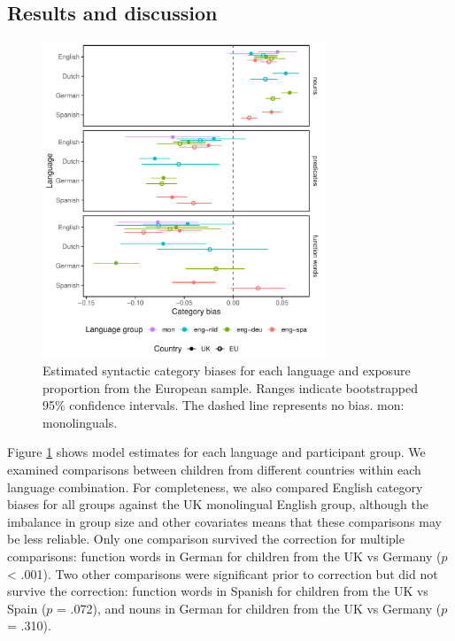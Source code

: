 \documentclass[10pt, letterpaper]{article}
\begin{document}
\subsection{Results and discussion}\label{results-and-discussion-2}

\begin{CodeChunk}
\begin{figure}[t]

{\centering \includegraphics[width=240pt]{figs/ox_bias-1} 

}

\caption[Estimated syntactic category biases for each language and exposure proportion from the European sample]{Estimated syntactic category biases for each language and exposure proportion from the European sample. Ranges indicate bootstrapped 95\% confidence intervals. The dashed line represents no bias. mon: monolinguals.}\label{fig:ox_bias}
\end{figure}
\end{CodeChunk}

Figure \ref{fig:ox_bias} shows model estimates for each language and
participant group. We examined comparisons between children from
different countries within each language combination. For completeness,
we also compared English category biases for all groups against the UK
monolingual English group, although the imbalance in group size and
other covariates means that these comparisons may be less reliable. Only
one comparison survived the correction for multiple comparisons:
function words in German for children from the UK vs Germany (\(p\)
\textless{} .001). Two other comparisons were significant prior to
correction but did not survive the correction: function words in Spanish
for children from the UK vs Spain (\(p\) = .072), and nouns in German
for children from the UK vs Germany (\(p\) = .310).
\end{document}
